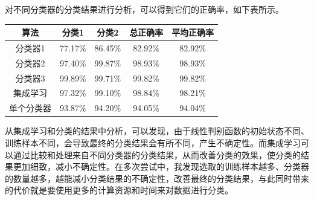 对不同分类器的分类结果进行分析，可以得到它们的正确率，如下表所示。\\
\begin{tabular}{ccccc}
	\toprule
	算法 & 分类1 & 分类2 & 总正确率 & 平均正确率 \\
	\midrule
	分类器1 & 77.17\% & 86.45\% & 82.92\% & 82.92\% \\
	分类器2 & 97.40\% & 99.87\% & 98.93\% & 98.93\% \\
	分类器3 & 99.89\% & 99.71\% & 99.82\% & 99.82\% \\
	集成学习 & 97.32\% & 99.10\% & 98.84\% & 98.21\%  \\
	单个分类器 & 93.87\% & 94.20\% & 94.05\% & 94.04\% \\
	\bottomrule
\end{tabular}

从集成学习和分类的结果中分析，可以发现，由于线性判别函数的初始状态不同、训练样本不同，会导致最终的分类结果会有所不同，产生不确定性。而集成学习可以通过比较和处理来自不同分类器的分类结果，从而改善分类的效果，使分类的结果更加细致，减小不确定性。在多次尝试中，我发现选取的训练样本越多、分类器的数量越多，越能减小分类结果的不确定性，改善最终的分类结果，与此同时带来的代价就是要使用更多的计算资源和时间来对数据进行分类。